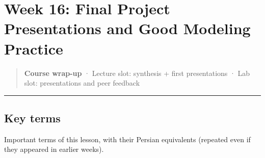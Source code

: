 \section{Week 16: Final Project Presentations and Good Modeling
Practice}

\begin{quote}
\textbf{Course wrap-up} · Lecture slot: synthesis + first presentations
· Lab slot: presentations and peer feedback
\end{quote}

\begin{center}\rule{0.5\linewidth}{0.5pt}\end{center}

\subsection{Key terms}

Important terms of this lesson, with their Persian equivalents (repeated
even if they appeared in earlier weeks).

